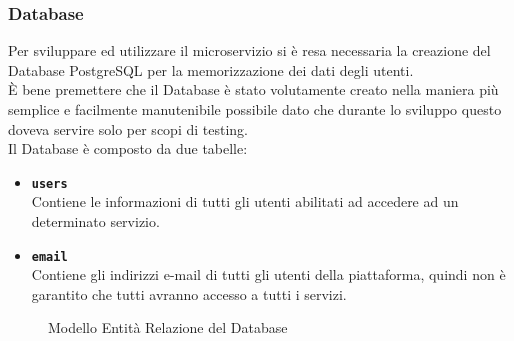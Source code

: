 \subsubsection{Database}
Per sviluppare ed utilizzare il microservizio si è resa necessaria la creazione del Database PostgreSQL per la memorizzazione dei dati degli utenti.\\
È bene premettere che il Database è stato volutamente creato nella maniera più semplice e facilmente manutenibile possibile dato che durante lo sviluppo questo doveva servire solo per scopi di testing.\\
Il Database è composto da due tabelle:
\begin{itemize}
		\item \textbf{\texttt{users}}\\ Contiene le informazioni di tutti gli utenti abilitati ad accedere ad un determinato servizio.
		\item \textbf{\texttt{email}}\\ Contiene gli indirizzi e-mail di tutti gli utenti della piattaforma, quindi non è garantito che tutti avranno accesso a tutti i servizi.
\end{itemize}
\begin{figure}[ht]
	\centering
	\caption{Modello Entità Relazione del Database}
	\label{fig:one}
\end{figure}

